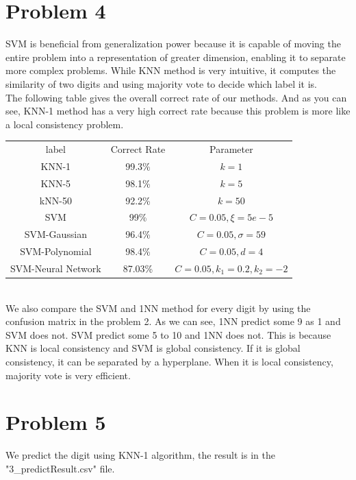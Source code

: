 \documentclass[11pt]{article}
\begin{document}
\section{Problem 4}
SVM is beneficial from generalization power because it is capable of moving the entire problem into a representation of greater dimension, enabling it to separate more complex problems. While KNN method is very intuitive, it computes the similarity of two digits and using majority vote to decide which label it is.\\
The following table gives the overall correct rate of our methods. And as you can see, KNN-1 method has a very high correct rate because this problem is more like a local consistency problem.\\
\begin{tabular}{|c|c|c|}
  \hline
  \textrm{label} & \textrm{Correct Rate} &\textrm{Parameter}\\ \cline{1-3}
  \textrm{KNN-1} & 99.3\% & $k = 1$ \\
  \textrm{KNN-5} & 98.1\% &$k=5$\\
  \textrm{kNN}-50 & 92.2\% &$k=50$\\
  \textrm{SVM} & 99\%  & $C=0.05, \xi = 5e-5$\\
  \textrm{SVM-Gaussian} & 96.4\% & $C= 0.05,\sigma = 59$\\
  \textrm{SVM-Polynomial} & 98.4\% & $C= 0.05, d = 4$\\
  \textrm{SVM-Neural Network} & 87.03\%& $C=0.05,k_1=0.2,k_2=-2$\\
  \hline
\end{tabular}
\\

We also compare the SVM and 1NN method for every digit by using the confusion matrix in the problem 2. As we can see,  1NN predict some 9 as 1 and SVM does not. SVM predict some 5 to 10 and 1NN does not. This is because KNN is local consistency and SVM is global consistency. If it is global consistency, it can be separated by a hyperplane. When it is local consistency, majority vote is very efficient.
\section{Problem 5}
We predict the digit using KNN-1 algorithm, the result is in the "3\_predictResult.csv" file.
\end{document}

